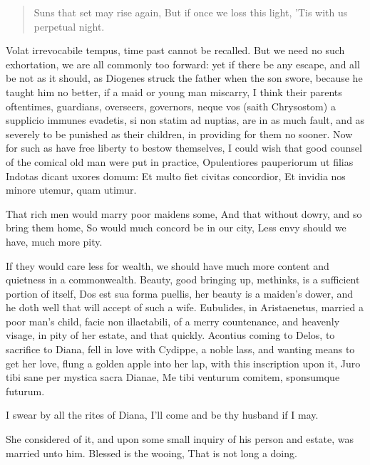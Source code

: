 {\begin{verse}
Suns that set may rise again,
But if once we loss this light,
'Tis with us perpetual night.
\end{verse}

Volat irrevocabile tempus, time past cannot be recalled. But we need no
such exhortation, we are all commonly too forward: yet if there be any
escape, and all be not as it should, as Diogenes struck the father when
the son swore, because he taught him no better, if a maid or young man
miscarry, I think their parents oftentimes, guardians, overseers,
governors, neque vos (saith Chrysostom) a supplicio immunes
evadetis, si non statim ad nuptias, \etc{} are in as much fault, and as
severely to be punished as their children, in providing for them no
sooner.
Now for such as have free liberty to bestow themselves, I could wish
that good counsel of the comical old man were put in practice,
Opulentiores pauperiorum ut filias
Indotas dicant uxores domum:
Et multo fiet civitas concordior,
Et invidia nos minore utemur, quam utimur.

That rich men would marry poor maidens some,
And that without dowry, and so bring them home,
So would much concord be in our city,
Less envy should we have, much more pity.

If they would care less for wealth, we should have much more content
and quietness in a commonwealth. Beauty, good bringing up, methinks, is
a sufficient portion of itself, Dos est sua forma puellis, her
beauty is a maiden's dower, and he doth well that will accept of such a
wife. Eubulides, in Aristaenetus, married a poor man's child,
facie non illaetabili, of a merry countenance, and heavenly visage, in
pity of her estate, and that quickly. Acontius coming to Delos, to
sacrifice to Diana, fell in love with Cydippe, a noble lass, and
wanting means to get her love, flung a golden apple into her lap, with
this inscription upon it,
Juro tibi sane per mystica sacra Dianae,
Me tibi venturum comitem, sponsumque futurum.

I swear by all the rites of Diana,
I'll come and be thy husband if I may.

She considered of it, and upon some small inquiry of his person and
estate, was married unto him.
Blessed is the wooing,
That is not long a doing.

}
